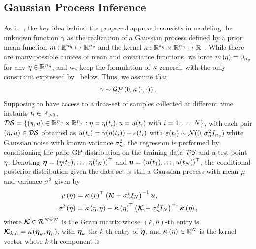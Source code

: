 \subsection{Gaussian Process Inference}%
\label{SEC:PREP-GAUSSIAN-INFERENCE}
As in~, the key idea behind the proposed approach consists in modeling the unknown function
$\gamma$ as the realization of a Gaussian process defined by a prior mean function $m: \mathbb{R}^{n_{\eta}} \mapsto \mathbb{R}^{n_{y}}$ and
the kernel $\kappa: \mathbb{R}^{n_{\eta}} \times \mathbb{R}^{n_{\eta}} \mapsto \mathbb{R}$ \cite{rasmussen2003gaussian}.
While there are many possible choices of mean and covariance functions, we force $m \left( \eta \right) = 0_{n_{y}}$
for any $\eta \in \mathbb{R}^{n_{\eta}}$, and we keep the formulation of $\kappa$ general, with
the only constraint expressed by~ below. 
Thus, we assume that
\begin{equation*}
   \gamma \sim \mathcal{GP} \left( 0, \kappa \left( \cdot, \cdot \right) \right).
\end{equation*}
Supposing to have access to a data-set of samples collected at different time instants $t_i \in \mathbb{R}_{>0}$,
$\mathcal{DS} = \{\left( \eta, u \right) \in \mathbb{R}^{n_{\eta}} \times \mathbb{R}^{n_{y}} : \eta = \eta(t_i), u = u(t_i) \text{ with } i = 1,\dots,N\}$,
with each pair $\left(\eta, u\right) \in \mathcal{DS}$ obtained as $u(t_i) = \gamma(\eta(t_i)) + \varepsilon(t_i)$ with
$\varepsilon(t_i) \sim \mathcal{N}(0, \sigma_n^2 I_{n_{y}})$ white Gaussian noise with known variance $\sigma_n^2$, the regression is performed by conditioning
the prior GP distribution on the training data $\mathcal{DS}$ and a test point $\eta$.
Denoting $\boldsymbol{\eta} = (\eta(t_1), \dots, \eta(t_N))^{\top}$ and $\boldsymbol{u} = (u(t_1), \dots, u(t_N))^{\top}$,
the conditional posterior distribution given the data-set is still a
Gaussian process with mean $\mu$ and variance $\sigma^2$ given by \cite{rasmussen2003gaussian}
\begin{equation}%
   \label{EQ:PREP-GP-POSTERIOR}
   \begin{split}
      \pmu \lp \im \rp & = \kv \lp \im \rp\T \lp \km + \nn I_{N} \rp^{-1} \ys, \\
      \pvar \lp \im \rp & = \kf \lp \im, \im \rp - \kv\lp \im \rp\T \lp \km + \nn I_{N} \rp^{-1}\kv\lp \im \rp,
   \end{split}
\end{equation}
where $\boldsymbol{\mathcal{K}} \in \mathcal{R}^{N \times N}$ is the Gram matrix whose $(k,h)$-th entry is $\boldsymbol{\mathcal{K}}_{k,h} = \kappa \left( \boldsymbol{\eta}_k, \boldsymbol{\eta}_h \right)$,
with $\boldsymbol{\eta}_k$ the $k$-th entry of $\boldsymbol{\eta}$, and $\boldsymbol{\kappa} \left( \eta \right) \in \mathbb{R}^N$ is the kernel vector whose $k$-th component is
